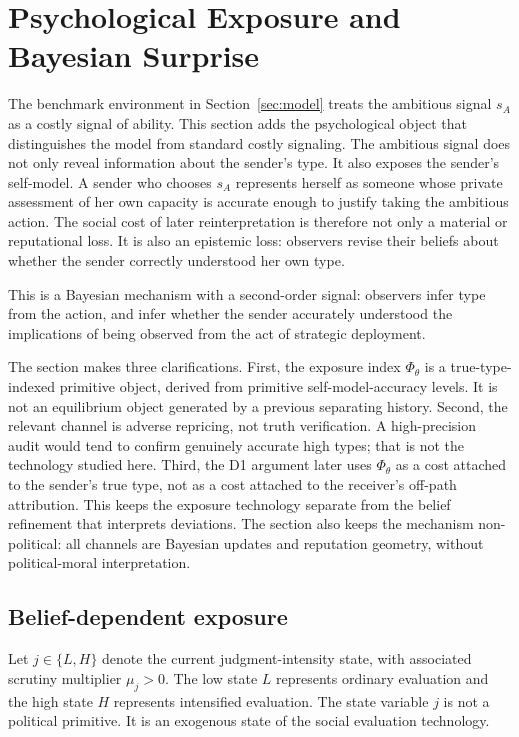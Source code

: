
\section{Psychological Exposure and Bayesian Surprise}
\label{sec:surprise}

The benchmark environment in Section~\ref{sec:model} treats the ambitious signal $s_A$ as a costly signal of ability. This section adds the psychological object that distinguishes the model from standard costly signaling. The ambitious signal does not only reveal information about the sender's type. It also exposes the sender's self-model. A sender who chooses $s_A$ represents herself as someone whose private assessment of her own capacity is accurate enough to justify taking the ambitious action. The social cost of later reinterpretation is therefore not only a material or reputational loss. It is also an epistemic loss: observers revise their beliefs about whether the sender correctly understood her own type.

This is a Bayesian mechanism with a second-order signal: observers infer type from the action, and infer whether the sender accurately understood the implications of being observed from the act of strategic deployment.

The section makes three clarifications. First, the exposure index $\Phi_\theta$ is a true-type-indexed primitive object, derived from primitive self-model-accuracy levels. It is not an equilibrium object generated by a previous separating history. Second, the relevant channel is adverse repricing, not truth verification. A high-precision audit would tend to confirm genuinely accurate high types; that is not the technology studied here. Third, the D1 argument later uses $\Phi_\theta$ as a cost attached to the sender's true type, not as a cost attached to the receiver's off-path attribution. This keeps the exposure technology separate from the belief refinement that interprets deviations.
The section also keeps the mechanism non-political: all channels are Bayesian updates and reputation geometry, without political-moral interpretation.

\subsection{Belief-dependent exposure}

Let $j\in\{L,H\}$ denote the current judgment-intensity state, with associated scrutiny multiplier $\mu_j>0$. The low state $L$ represents ordinary evaluation and the high state $H$ represents intensified evaluation. The state variable $j$ is not a political primitive. It is an exogenous state of the social evaluation technology.

